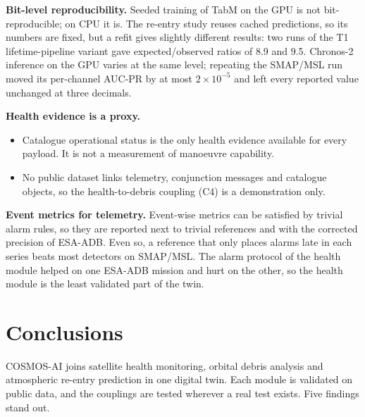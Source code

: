 \documentclass[
]{article}
\providecommand{\tightlist}{%
  \setlength{\itemsep}{0pt}\setlength{\parskip}{0pt}}
\begin{document}
\textbf{Bit-level reproducibility.} Seeded training of TabM on the GPU
is not bit-reproducible; on CPU it is. The re-entry study reuses cached
predictions, so its numbers are fixed, but a refit gives slightly
different results: two runs of the T1 lifetime-pipeline variant gave
expected/observed ratios of 8.9 and 9.5. Chronos-2 inference on the GPU
varies at the same level; repeating the SMAP/MSL run moved its
per-channel AUC-PR by at most \(2 \times 10^{-5}\) and left every
reported value unchanged at three decimals.

\textbf{Health evidence is a proxy.}

\begin{itemize}
\tightlist
\item
  Catalogue operational status is the only health evidence available for
  every payload. It is not a measurement of manoeuvre capability.
\item
  No public dataset links telemetry, conjunction messages and catalogue
  objects, so the health-to-debris coupling (C4) is a demonstration
  only.
\end{itemize}

\textbf{Event metrics for telemetry.} Event-wise metrics can be
satisfied by trivial alarm rules, so they are reported next to trivial
references and with the corrected precision of ESA-ADB. Even so, a
reference that only places alarms late in each series beats most
detectors on SMAP/MSL. The alarm protocol of the health module helped on
one ESA-ADB mission and hurt on the other, so the health module is the
least validated part of the twin.

\section{Conclusions}\label{sec:conclusions}

COSMOS-AI joins satellite health monitoring, orbital debris analysis and
atmospheric re-entry prediction in one digital twin. Each module is
validated on public data, and the couplings are tested wherever a real
test exists. Five findings stand out.
\end{document}
